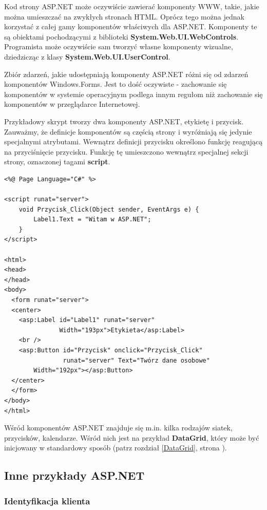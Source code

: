Kod strony ASP.NET może oczywiście zawierać komponenty WWW, takie, jakie można umieszczać na
zwykłych stronach HTML. Oprócz tego można jednak korzystać z całej gamy komponentów właściwych dla
ASP.NET. Komponenty te są obiektami pochodzącymi z biblioteki {\bf System.Web.UI.WebControls}.
Programista może oczywiście sam tworzyć własne komponenty wizualne, dziedzicząc z klasy
{\bf System.Web.UI.UserControl}.

Zbiór zdarzeń, jakie udostępniają komponenty ASP.NET różni się od zdarzeń komponentów Windows.Forms.
Jest to dość oczywiste - zachowanie się komponentów w systemie operacyjnym podlega innym regułom
niż zachowanie się komponentów w przeglądarce Internetowej.

Przykładowy skrypt tworzy dwa komponenty ASP.NET, etykietę i przycisk. Zauważmy, że definicje 
komponentów są częścią strony i wyróżniają się jedynie specjalnymi atrybutami. Wewnątrz definicji 
przycisku określono funkcję reagującą na przyciśnięcie przycisku. Funkcję tę umieszczono wewnątrz
specjalnej sekcji strony, oznaczonej tagami {\bf script}.

\begin{scriptsize}
\begin{verbatim}
<%@ Page Language="C#" %>

<script runat="server">
    void Przycisk_Click(Object sender, EventArgs e) {
        Label1.Text = "Witam w ASP.NET";
    }
</script>

<html>
<head>
</head>
<body>
  <form runat="server">
  <center>
    <asp:Label id="Label1" runat="server" 
               Width="193px">Etykieta</asp:Label>
    <br />
    <asp:Button id="Przycisk" onclick="Przycisk_Click" 
                runat="server" Text="Twórz dane osobowe" 
		Width="192px"></asp:Button>
  </center>
  </form>
</body>
</html>
\end{verbatim}
\end{scriptsize}

Wśród komponentów ASP.NET znajduje się m.in. kilka rodzajów siatek, przycisków, kalendarze. Wśród nich 
jest na przykład {\bf DataGrid}, który może być inicjowany w standardowy sposób (patrz rozdział 
\ref{DataGrid}, strona \pageref{DataGrid}).

\subsection{Inne przykłady ASP.NET}

\subsubsection{Identyfikacja klienta}

